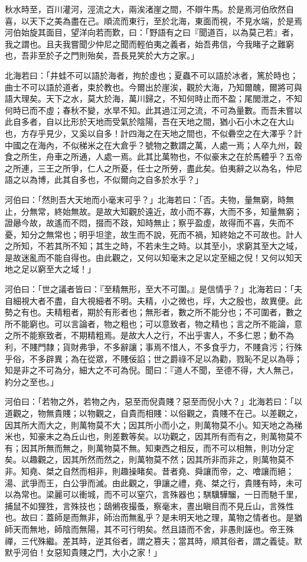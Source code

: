 
\begin{pinyinscope}
秋水時至，百川灌河，涇流之大，兩涘渚崖之間，不辯牛馬。於是焉河伯欣然自喜，以天下之美為盡在己。順流而東行，至於北海，東面而視，不見水端，於是焉河伯始旋其面目，望洋向若而歎，曰：「野語有之曰『聞道百，以為莫己若』者，我之謂也。且夫我嘗聞少仲尼之聞而輕伯夷之義者，始吾弗信，今我睹子之難窮也，吾非至於子之門則殆矣，吾長見笑於大方之家。」

北海若曰：「井蛙不可以語於海者，拘於虛也；夏蟲不可以語於冰者，篤於時也；曲士不可以語於道者，束於教也。今爾出於崖涘，觀於大海，乃知爾醜，爾將可與語大理矣。天下之水，莫大於海，萬川歸之，不知何時止而不盈；尾閭泄之，不知何時已而不虛；春秋不變，水旱不知。此其過江河之流，不可為量數。而吾未嘗以此自多者，自以比形於天地而受氣於陰陽，吾在天地之間，猶小石小木之在大山也，方存乎見少，又奚以自多！計四海之在天地之間也，不似礨空之在大澤乎？計中國之在海內，不似稊米之在大倉乎？號物之數謂之萬，人處一焉；人卒九州，穀食之所生，舟車之所通，人處一焉。此其比萬物也，不似豪末之在於馬體乎？五帝之所連，三王之所爭，仁人之所憂，任士之所勞，盡此矣。伯夷辭之以為名，仲尼語之以為博，此其自多也，不似爾向之自多於水乎？」

河伯曰：「然則吾大天地而小毫末可乎？」北海若曰：「否。夫物，量無窮，時無止，分無常，終始無故。是故大知觀於遠近，故小而不寡，大而不多，知量無窮；證曏今故，故遙而不悶，掇而不跂，知時無止；察乎盈虛，故得而不喜，失而不憂，知分之無常也；明乎坦塗，故生而不說，死而不禍，知終始之不可故也。計人之所知，不若其所不知；其生之時，不若未生之時。以其至小，求窮其至大之域，是故迷亂而不能自得也。由此觀之，又何以知毫末之足以定至細之倪！又何以知天地之足以窮至大之域！」

河伯曰：「世之議者皆曰：『至精無形，至大不可圍。』是信情乎？」北海若曰：「夫自細視大者不盡，自大視細者不明。夫精，小之微也，垺，大之殷也，故異便。此勢之有也。夫精粗者，期於有形者也；無形者，數之所不能分也；不可圍者，數之所不能窮也。可以言論者，物之粗也；可以意致者，物之精也；言之所不能論，意之所不能察致者，不期精粗焉。是故大人之行，不出乎害人，不多仁恩；動不為利，不賤門隸；貨財弗爭，不多辭讓；事焉不惜人，不多食乎力，不賤貪污；行殊乎俗，不多辟異；為在從眾，不賤佞諂；世之爵祿不足以為勸，戮恥不足以為辱；知是非之不可為分，細大之不可為倪。聞曰：『道人不聞，至德不得，大人無己，約分之至也。」

河伯曰：「若物之外，若物之內，惡至而倪貴賤？惡至而倪小大？」北海若曰：「以道觀之，物無貴賤；以物觀之，自貴而相賤：以俗觀之，貴賤不在己。以差觀之，因其所大而大之，則萬物莫不大；因其所小而小之，則萬物莫不小。知天地之為稊米也，知豪末之為丘山也，則差數等矣。以功觀之，因其所有而有之，則萬物莫不有；因其所無而無之，則萬物莫不無。知東西之相反，而不可以相無，則功分定矣。以趣觀之，因其所然而然之，則萬物莫不然；因其所非而非之，則萬物莫不非。知堯、桀之自然而相非，則趣操睹矣。昔者堯、舜讓而帝，之、噲讓而絕；湯、武爭而王，白公爭而滅。由此觀之，爭讓之禮，堯、桀之行，貴賤有時，未可以為常也。梁麗可以衝城，而不可以窒穴，言殊器也；騏驥驊騮，一日而馳千里，捕鼠不如狸狌，言殊技也；鴟鵂夜撮蚤，察毫末，晝出瞋目而不見丘山，言殊性也。故曰：蓋師是而無非，師治而無亂乎？是未明天地之理，萬物之情者也。是猶師天而無地，師陰而無陽，其不可行明矣。然且語而不舍，非愚則誣也。帝王殊禪，三代殊繼。差其時，逆其俗者，謂之篡夫；當其時，順其俗者，謂之義徒。默默乎河伯！女惡知貴賤之門，大小之家！」


\end{pinyinscope}
